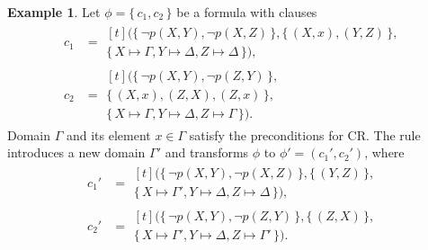 \documentclass{article}
\theoremstyle{definition}
\newtheorem{example}{Example}
\begin{document}
\begin{example}
  Let $\phi = \{\, c_1, c_2 \,\}$ be a formula with clauses
  \begin{align*}
    c_1 &=
          \begin{multlined}[t]
            (\{\, \neg p(X, Y), \neg p(X, Z) \,\}, \{\, (X, x), (Y, Z) \,\}, \\
            \{\, X \mapsto \Gamma, Y \mapsto \Delta, Z \mapsto \Delta \,\}),
          \end{multlined}\\
    c_2 &=
          \begin{multlined}[t]
            (\{\, \neg p(X, Y), \neg p(Z, Y) \,\}, \\
            \{\, (X, x), (Z, X), (Z, x) \,\}, \\
            \{\, X \mapsto \Gamma, Y \mapsto \Delta, Z \mapsto \Gamma \,\}).
          \end{multlined}
  \end{align*}
  Domain $\Gamma$ and its element $x \in \Gamma$ satisfy the preconditions for
  CR\@. The rule introduces a new domain $\Gamma'$ and transforms $\phi$ to
  $\phi' = (c_1', c_2')$, where
  \begin{align*}
    c_1' &=
           \begin{multlined}[t]
             (\{\, \neg p(X, Y), \neg p(X, Z) \,\}, \{\, (Y, Z) \,\}, \\
             \{\, X \mapsto \Gamma', Y \mapsto \Delta, Z \mapsto \Delta \,\}),
           \end{multlined} \\
    c_2' &=
           \begin{multlined}[t]
             (\{\, \neg p(X, Y), \neg p(Z, Y) \,\}, \{\, (Z, X) \,\}, \\
             \{\, X \mapsto \Gamma', Y \mapsto \Delta, Z \mapsto \Gamma' \,\}).
           \end{multlined}
  \end{align*}
\end{example}
\end{document}
